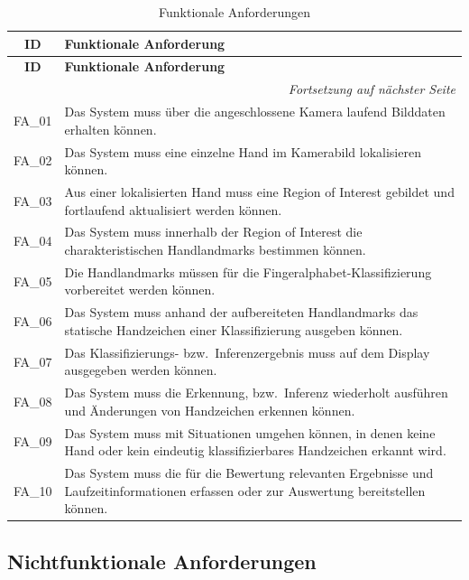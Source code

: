 \begin{longtable}{|c|p{}|}
    \caption{Funktionale Anforderungen}
    \label{tab:funktionale-anforderungen} \\
    \hline
    \textbf{ID} & \textbf{Funktionale Anforderung} \\
    \hline
    \endfirsthead
    \hline
    \textbf{ID} & \textbf{Funktionale Anforderung} \\
    \hline
    \endhead
    \hline
    \multicolumn{2}{r}{\textit{Fortsetzung auf nächster Seite}} \\
    \endfoot
    \hline
    \endlastfoot
    FA\_01 & Das System muss über die angeschlossene Kamera laufend Bilddaten erhalten können. \\
    \hline
    FA\_02 & Das System muss eine einzelne Hand im Kamerabild lokalisieren können. \\
    \hline
    FA\_03 & Aus einer lokalisierten Hand muss eine Region of Interest gebildet und fortlaufend aktualisiert werden können. \\
    \hline
    FA\_04 & Das System muss innerhalb der Region of Interest die charakteristischen Handlandmarks bestimmen können. \\
    \hline
    FA\_05 & Die Handlandmarks müssen für die Fingeralphabet-Klassifizierung vorbereitet werden können. \\
    \hline
    FA\_06 & Das System muss anhand der aufbereiteten Handlandmarks das statische Handzeichen einer Klassifizierung ausgeben können. \\
    \hline
    FA\_07 & Das Klassifizierungs- bzw.\ Inferenzergebnis muss auf dem Display ausgegeben werden können. \\
    \hline
    FA\_08 & Das System muss die Erkennung, bzw.\ Inferenz wiederholt ausführen und Änderungen von Handzeichen erkennen können. \\
    \hline
    FA\_09 & Das System muss mit Situationen umgehen können, in denen keine Hand oder kein eindeutig klassifizierbares Handzeichen erkannt wird. \\
    \hline
    FA\_10 & Das System muss die für die Bewertung relevanten Ergebnisse und Laufzeitinformationen erfassen oder zur Auswertung bereitstellen können. \\
    \hline
\end{longtable}

\subsection{Nichtfunktionale Anforderungen}

